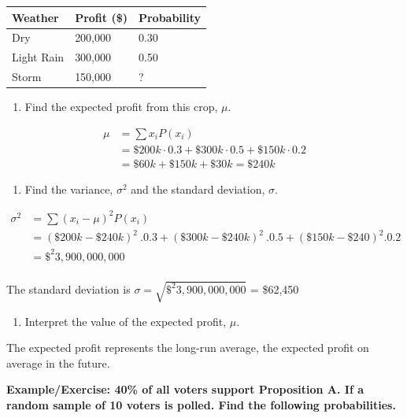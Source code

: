 \documentclass[
]{book}
\providecommand{\tightlist}{%
  \setlength{\itemsep}{0pt}\setlength{\parskip}{0pt}}
\begin{document}
\begin{longtable}[]{@{}lll@{}}
\toprule\noalign{}
\textbf{Weather} & \textbf{Profit (\$)} & \textbf{Probability} \\
\midrule\noalign{}
\endhead
\bottomrule\noalign{}
\endlastfoot
Dry & 200,000 & 0.30 \\
Light Rain & 300,000 & 0.50 \\
Storm & 150,000 & ? \\
\end{longtable}

\begin{enumerate}
\def\labelenumi{\arabic{enumi}.}
\setcounter{enumi}{1}
\tightlist
\item
  Find the expected profit from this crop, \(\mu\).
\end{enumerate}

\[
\begin{aligned}
\mu &= \sum{x_i}P(x_i) \\
    &= \$200k \cdot 0.3 + \$300k \cdot 0.5 + \$150k \cdot 0.2 \\
    &= \$60k + \$150k + \$30k = \$240k
\end{aligned}
\]

\begin{enumerate}
\def\labelenumi{\arabic{enumi}.}
\setcounter{enumi}{2}
\tightlist
\item
  Find the variance, \(\sigma^2\) and the standard deviation, \(\sigma\).
\end{enumerate}

\[
\begin{aligned}
\sigma^2 &= \sum(x_i-\mu)^2P(x_i) \\
&= (\$200k-\$240k)^2 \ . 0.3 + (\$300k-\$240k)^2 \ . 0.5 + (\$150k-\$240)^2 . 0.2 \\
&= \$^2 3,900, 000, 000 \\
\end{aligned}
\]

The standard deviation is \(\sigma = \sqrt{\$^2 3,900,000,000}\) = \$62,450

\begin{enumerate}
\def\labelenumi{\arabic{enumi}.}
\setcounter{enumi}{3}
\tightlist
\item
  Interpret the value of the expected profit, \(\mu\).
\end{enumerate}

The expected profit represents the long-run average, the expected profit on average in the future.

\textbf{Example/Exercise: 40\% of all voters support Proposition A. If a random sample of 10 voters is polled. Find the following probabilities.}
\end{document}
